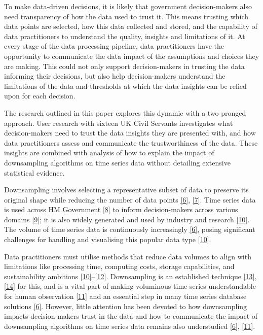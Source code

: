 \documentclass{article}
\begin{document}
To make data-driven decisions, it is likely that government
decision-makers also need transparency of how the data used to trust it.
This means trusting which data points are selected, how this data
collected and stored, and the capability of data practitioners to
understand the quality, insights and limitations of it. At every stage
of the data processing pipeline, data practitioners have the opportunity
to communicate the data impact of the assumptions and choices they are
making. This could not only support decision-makers in trusting the data
informing their decisions, but also help decision-makers understand the
limitations of the data and thresholds at which the data insights can be
relied upon for each decision.

The research outlined in this paper explores this dynamic with a two
pronged approach. User research with sixteen UK Civil Servants
investigates what decision-makers need to trust the data insights they
are presented with, and how data practitioners assess and communicate
the trustworthiness of the data. These insights are combined with
analysis of how to explain the impact of downsampling algorithms on time
series data without detailing extensive statistical evidence.

Downsampling involves selecting a representative subset of data to
preserve its original shape while reducing the number of data points
\protect\hyperlink{ref-datapoint}{{[}6{]}},
\protect\hyperlink{ref-MinMaxLTTB}{{[}7{]}}. Time series data is used
across HM Government \protect\hyperlink{ref-pathway}{{[}8{]}} to inform
decision-makers across various domains
\protect\hyperlink{ref-onstool}{{[}9{]}}; it is also widely generated
and used by industry and research
\protect\hyperlink{ref-TVStore}{{[}10{]}}. The volume of time series
data is continuously increasingly
\protect\hyperlink{ref-datapoint}{{[}6{]}}, posing significant
challenges for handling and visualising this popular data type
\protect\hyperlink{ref-TVStore}{{[}10{]}}.

Data practitioners must utilise methods that reduce data volumes to
align with limitations like processing time, computing costs, storage
capabilities, and sustainability ambitions
\protect\hyperlink{ref-TVStore}{{[}10{]}}--\protect\hyperlink{ref-Shift}{{[}12{]}}.
Downsampling is an established technique
\protect\hyperlink{ref-downsampling}{{[}13{]}},
\protect\hyperlink{ref-sampling}{{[}14{]}} for this, and is a vital part
of making voluminous time series understandable for human observation
\protect\hyperlink{ref-Sveinn}{{[}11{]}} and an essential step in many
time series database solutions
\protect\hyperlink{ref-datapoint}{{[}6{]}}. However, little attention
has been devoted to how downsampling impacts decision-makers trust in
the data and how to communicate the impact of downsampling algorithms on
time series data remains also understudied
\protect\hyperlink{ref-datapoint}{{[}6{]}},
\protect\hyperlink{ref-Sveinn}{{[}11{]}}.
\end{document}
